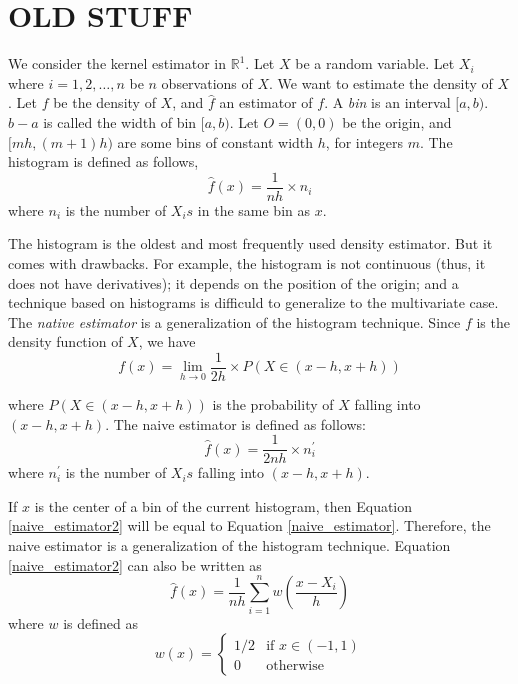 \section{OLD STUFF} %
\label{sec:old_stuff}

We consider the kernel
estimator in
$\mathbb{R}^1$. Let $X$ be a random variable. Let $X_i$ where $i=1,2,\ldots,n$ be
$n$ observations of $X$. We want to estimate the density  of $X$. Let $f$ be the
density of $X$, and $\hat{f}$ an estimator of $f$. A \emph{bin} is an interval
$[a,b)$. $b-a$ is called the width of bin $[a,b)$. Let $O=(0,0)$ be the origin, 
and $[mh, (m+1)h)$ are some bins of constant width $h$, for integers $m$. The
histogram is defined as follows,
\begin{equation}\label{eq:histogram}
	\hat{f}(x)=\frac{1}{nh} \times n_i
\end{equation}
where $n_i$ is the number of $X_i s$ in the same bin as $x$.

The histogram is the oldest and most frequently used density estimator. But it 
comes with drawbacks. For example, the histogram is not continuous (thus, it 
does not have derivatives); it depends on the position of the origin; and a 
technique based on histograms is difficuld to generalize to the multivariate 
case. The \emph{native estimator} is a generalization of the histogram 
technique. Since $f$ is the density function of $X$, we have
\begin{equation}\label{eq:naive_estimator}
	f(x) = \lim\limits_{h \rightarrow 0} \frac{1}{2h} \times P(X \in (x-h,x+h))
\end{equation}

where $P(X \in (x-h,x+h))$ is the probability of $X$ falling into $(x-h,x+h)$.
The naive estimator is defined as follows:
\begin{equation}\label{eq:naive_estimator2}
	\hat{f}(x) = \frac{1}{2nh} \times n_i^{\prime}
\end{equation}
where $n_i^{\prime}$ is the number of $X_i s$ falling into $(x-h,x+h)$. 

If $x$ is the center of a bin of the current histogram, then Equation 
\eqref{naive_estimator2} will be equal to Equation \eqref{naive_estimator}. 
Therefore, the naive estimator is a generalization of the histogram technique.
Equation \eqref{naive_estimator2} can also be written as
\begin{equation}\label{eq:naive_estimator3}
	\hat{f}(x) = \frac{1}{nh}\sum_{i=1}^n w\left( \frac{x - X_i}{h} \right)
\end{equation}
where $w$ is defined as 
\begin{equation}\label{naive_estimator3}
	w(x) = \begin{cases}
				1/2 & \text{if } x \in (-1,1) \\
				0 & \text{otherwise }
		\end{cases}
\end{equation}

